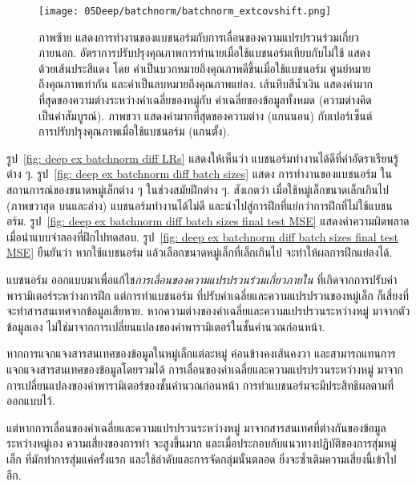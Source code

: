 \begin{Exercise}
\begin{figure}[H]
	\begin{center}	
		\texttt{[image: 05Deep/batchnorm/batchnorm\_extcovshift.png]}
	\end{center}		
	\caption[คุณภาพของแบชนอร์มกับการเลื่อนของความแปรปรวนร่วมเกี่ยวภายนอก]{
ภาพซ้าย แสดงการทำงานของแบชนอร์มกับการเลื่อนของความแปรปรวนร่วมเกี่ยวภายนอก.		อัตราการปรับปรุงคุณภาพการทำนายเมื่อใช้แบชนอร์มเทียบกับไม่ใช้ แสดงด้วยเส้นประสีแดง โดย 
ค่าเป็นบวกหมายถึงคุณภาพดีขึ้นเมื่อใช้แบชนอร์ม
ศูนย์หมายถึงคุณภาพเท่ากัน 
และค่าเป็นลบหมายถึงคุณภาพแย่ลง.
เส้นทึบสีน้ำเงิน แสดงค่ามากที่สุดของความต่างระหว่างค่าเฉลี่ยของหมู่กับ
ค่าเฉลี่ยของข้อมูลทั้งหมด (ความต่างคิดเป็นค่าสัมบูรณ์).
ภาพขวา แสดงค่ามากที่สุดของความต่าง (แกนนอน)
กับเปอร์เซ็นต์การปรับปรุงคุณภาพเมื่อใช้แบชนอร์ม (แกนตั้ง).
}
	\label{fig: deep ex batchnorm external covariance shift}
\end{figure}
%




รูป~\ref{fig: deep ex batchnorm diff LRs}
แสดงให้เห็นว่า แบชนอร์มทำงานได้ดีที่ค่าอัตราเรียนรู้ต่าง ๆ.
รูป~\ref{fig: deep ex batchnorm diff batch sizes}
แสดง การทำงานของแบชนอร์ม
ในสถานการณ์ของขนาดหมู่เล็กต่าง ๆ ในช่วงสมัยฝึกต่าง ๆ.
สังเกตว่า
เมื่อใช้หมู่เล็กขนาดเล็กเกินไป
(ภาพขวาสุด บนและล่าง)
แบชนอร์มทำงานได้ไม่ดี และนำไปสู่การฝึกที่แย่กว่าการฝึกที่ไม่ใช้แบชนอร์ม.
รูป~\ref{fig: deep ex batchnorm diff batch sizes final test MSE}
แสดงค่าความผิดพลาดเมื่อนำแบบจำลองที่ฝึกไปทดสอบ.
รูป~\ref{fig: deep ex batchnorm diff batch sizes final test MSE}
ยืนยันว่า
หากใช้แบชนอร์ม
แล้วเลือกขนาดหมู่เล็กที่เล็กเกินไป
จะทำให้ผลการฝึกแย่ลงได้.

แบชนอร์ม ออกแบบมาเพื่อแก้ไข\textit{การเลื่อนของความแปรปรวนร่วมเกี่ยวภายใน} ที่เกิดจากการปรับค่าพารามิเตอร์ระหว่างการฝึก
แต่การทำแบชนอร์ม
ที่ปรับค่าเฉลี่ยและความแปรปรวนของหมู่เล็ก ก็เสี่ยงที่จะทำสารสนเทศจากข้อมูลเสียหาย.
หากความต่างของค่าเฉลี่ยและความแปรปรวนระหว่างหมู่
มาจากตัวข้อมูลเอง ไม่ใช่มาจากการเปลี่ยนแปลงของค่าพารามิเตอร์ในชั้นคำนวณก่อนหน้า.

หากการแจกแจงสารสนเทศของข้อมูลในหมู่เล็กแต่ละหมู่
ค่อนข้างคงเส้นคงวา และสามารถแทนการแจกแจงสารสนเทศของข้อมูลโดยรวมได้
การเลื่อนของค่าเฉลี่ยและความแปรปรวนระหว่างหมู่
มาจากการเปลี่ยนแปลงของค่าพารามิเตอร์ของชั้นคำนวณก่อนหน้า
การทำแบชนอร์มจะมีประสิทธิผลตามที่ออกแบบไว้.

แต่หากการเลื่อนของค่าเฉลี่ยและความแปรปรวนระหว่างหมู่
มาจากสารสนเทศที่ต่างกันของข้อมูลระหว่างหมู่เอง
ความเสี่ยงของการทำ จะสูงขึ้นมาก
และเมื่อประกอบกับแนวทางปฏิบัติของการสุ่มหมู่เล็ก
ที่มักทำการสุ่มแค่ครั้งแรก และใช้ลำดับและการจัดกลุ่มนั้นตลอด
ยิ่งจะซ้ำเติมความเสี่ยงนี้เข้าไปอีก.


\end{Exercise}
